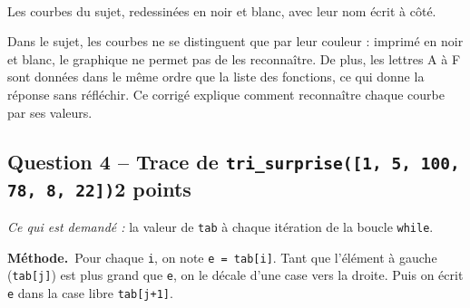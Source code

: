 \documentclass[11pt, a4paper]{exam}
\newcommand{\code}[1]{\texttt{#1}}
\newcommand{\Qt}[2]{\subsection*{#1\hfill{\normalfont\small #2}}}
\newcommand{\rappel}[1]{\noindent\textit{Ce qui est demandé :} #1\par\smallskip}
\newcommand{\methode}{\noindent\textbf{Méthode.}\ }
\begin{document}
\begin{center}
\\
{\small Les courbes du sujet, redessinées en noir et blanc, avec leur nom écrit à côté.}
\end{center}

\begin{remarque}
Dans le sujet, les courbes ne se distinguent que par leur couleur : imprimé en noir et blanc, le graphique ne permet pas de les reconnaître. De plus, les lettres A à F sont données dans le même ordre que la liste des fonctions, ce qui donne la réponse sans réfléchir. Ce corrigé explique comment reconnaître chaque courbe par ses valeurs.
\end{remarque}

\Qt{Question 4 -- Trace de \code{tri\_surprise([1, 5, 100, 78, 8, 22])}}{2 points}
\rappel{la valeur de \code{tab} à chaque itération de la boucle \code{while}.}

\methode Pour chaque \code{i}, on note \code{e = tab[i]}. Tant que l'élément à gauche (\code{tab[j]}) est plus grand que \code{e}, on le décale d'une case vers la droite. Puis on écrit \code{e} dans la case libre \code{tab[j+1]}.
\end{document}
